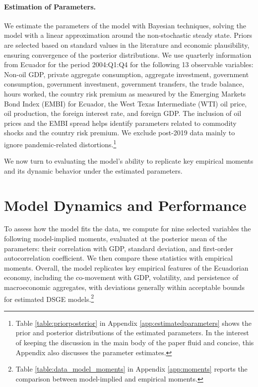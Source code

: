 \documentclass[12pt]{article}
\begin{document}
\paragraph{Estimation of Parameters.}
We estimate the parameters of the model with Bayesian techniques, solving the model with a linear approximation around the non-stochastic steady state. Priors are selected based on standard values in the literature and economic plausibility, ensuring convergence of the posterior distributions. We use quarterly information from Ecuador for the period 2004:Q1:Q4 for the following 13 observable variables: Non-oil GDP, private aggregate consumption, aggregate investment, government consumption, government investment, government transfers, the trade balance, hours worked, the country risk premium as measured by the Emerging Markets Bond Index (EMBI) for Ecuador, the West Texas Intermediate (WTI) oil price, oil production, the foreign interest rate, and foreign GDP. The inclusion of oil prices and the EMBI spread helps identify parameters related to commodity shocks and the country risk premium. We exclude post-2019 data mainly to ignore pandemic-related distortions.\footnote{Table \ref{table:priorposterior} in Appendix \ref{app:estimatedparameters} shows the prior and posterior distributions of the estimated parameters. In the interest of keeping the discussion in the main body of the paper fluid and concise, this Appendix also discusses the parameter estimates.}

We now turn to evaluating the model’s ability to replicate key empirical moments and its dynamic behavior under the estimated parameters.


\section{Model Dynamics and Performance}\label{sec:performance}

To assess how the model fits the data, we compute for nine selected variables the following model-implied moments, evaluated at the posterior mean of the parameters: their correlation with GDP, standard deviation, and first-order autocorrelation coefficient. We then compare these statistics with empirical moments. Overall, the model replicates key empirical features of the Ecuadorian economy, including the co-movement with GDP, volatility, and persistence of macroeconomic aggregates, with deviations generally within acceptable bounds for estimated DSGE models.\footnote{Table \ref{table:data_model_moments} in Appendix \ref{app:moments} reports the comparison between model-implied and empirical moments.}
\end{document}
